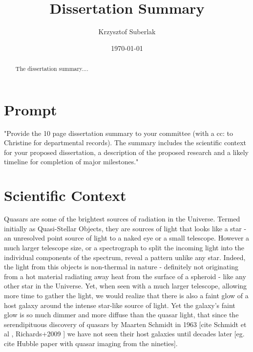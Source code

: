 \documentclass[modern]{aastex62}
\begin{document}
\title{Dissertation Summary}
\author{Krzysztof Suberlak}

\date{ \today
}

\begin{abstract}
The dissertation summary.... 
\end{abstract}

\section*{Prompt}
"Provide the 10 page dissertation summary to your committee (with a cc: to Christine for
departmental records). The summary includes the scientific context for your proposed
dissertation, a description of the proposed research and a likely timeline for completion of
major milestones."

\section{Scientific Context}

Quasars are some of the brightest sources of radiation in the Universe.  Termed initially as Quasi-Stellar Objects, they are sources of light that looks like a star - an unresolved point source of light to a naked eye or a small telescope. However a much larger telescope size, or a spectrograph to split the incoming light into the individual components of the spectrum, reveal a pattern unlike any star. Indeed, the light from this objects is non-thermal in nature - definitely not originating from a hot material radiating away heat from the surface of a spheroid - like any other star in the Universe. Yet, when seen with a much larger telescope, allowing more time to gather the light, we would realize that there is also a faint glow of a host galaxy around the intense star-like source of light.  Yet the galaxy's faint glow is so much dimmer and more diffuse than the quasar light, that since the serendipituous discovery of quasars by Maarten Schmidt in 1963 [cite Schmidt et al , Richards+2009 ] we have not seen their host galaxies until decades later [eg. cite Hubble paper with quasar imaging from the nineties]. 
\end{document}
